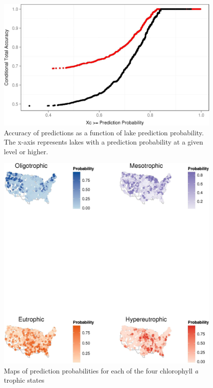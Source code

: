 \documentclass[11pt,]{article}
\begin{document}
\begin{figure}[htbp]
\centering
\includegraphics{manuscript_files/figure-latex/cond_prob_fig-1.jpeg}
\caption{Accuracy of predictions as a function of lake prediction
probability. The x-axis represents lakes with a prediction probability
at a given level or higher. \label{fig:cond_prob_fig}}
\end{figure}

\newpage

\begin{figure}[htbp]
\centering
\includegraphics{manuscript_files/figure-latex/gis_probability_map-1.jpeg}
\caption{Maps of prediction probabilities for each of the four
chlorophyll \textit{a} trophic states \label{fig:gis_probability_map}}
\end{figure}
\end{document}
